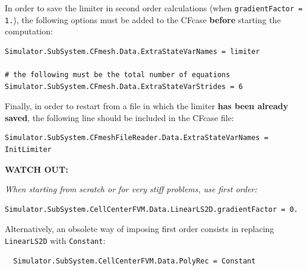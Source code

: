 \documentclass[11pt]{article}
\begin{document}
In order to save the limiter in second order calculations (when {\tt gradientFactor = 1.}), the following options must be added to the CFcase {\bf before} 
starting the computation:

\begin{verbatim}
Simulator.SubSystem.CFmesh.Data.ExtraStateVarNames = limiter

# the following must be the total number of equations
Simulator.SubSystem.CFmesh.Data.ExtraStateVarStrides = 6
\end{verbatim}

Finally, in order to restart from a file in which the limiter {\bf has been already saved}, 
the following line should be included in the CFcase file:

\begin{verbatim}
Simulator.SubSystem.CFmeshFileReader.Data.ExtraStateVarNames = InitLimiter
\end{verbatim}

{\bf WATCH OUT:} {\it When starting from scratch or for very stiff problems, use first order:
\begin{verbatim}
Simulator.SubSystem.CellCenterFVM.Data.LinearLS2D.gradientFactor = 0.
\end{verbatim}
  
  Alternatively, an obsolete way of imposing first order consists in replacing {\tt LinearLS2D} with {\tt Constant}:

\begin{verbatim}
  Simulator.SubSystem.CellCenterFVM.Data.PolyRec = Constant
\end{verbatim}
}

% 
% 
% 
\end{document}
